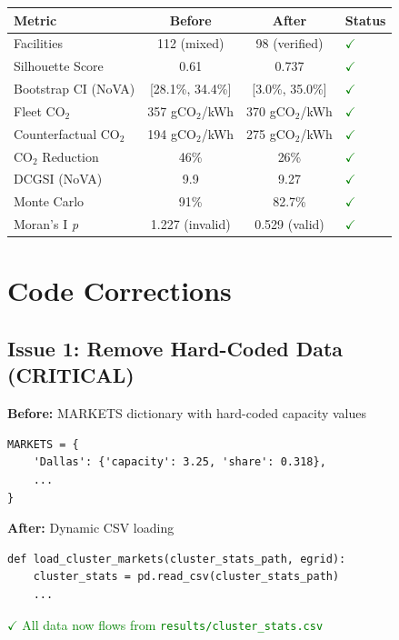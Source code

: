 \documentclass[11pt,a4paper]{article}
\begin{document}
\begin{center}
\begin{tabular}{lccl}
\toprule
\textbf{Metric} & \textbf{Before} & \textbf{After} & \textbf{Status} \\
\midrule
Facilities & 112 (mixed) & 98 (verified) & \textcolor{green}{$\checkmark$} \\
Silhouette Score & 0.61 & 0.737 & \textcolor{green}{$\checkmark$} \\
Bootstrap CI (NoVA) & {[}28.1\%, 34.4\%{]} & {[}3.0\%, 35.0\%{]} & \textcolor{green}{$\checkmark$} \\
Fleet CO$_2$ & 357 gCO$_2$/kWh & 370 gCO$_2$/kWh & \textcolor{green}{$\checkmark$} \\
Counterfactual CO$_2$ & 194 gCO$_2$/kWh & 275 gCO$_2$/kWh & \textcolor{green}{$\checkmark$} \\
CO$_2$ Reduction & 46\% & 26\% & \textcolor{green}{$\checkmark$} \\
DCGSI (NoVA) & 9.9 & 9.27 & \textcolor{green}{$\checkmark$} \\
Monte Carlo & 91\% & 82.7\% & \textcolor{green}{$\checkmark$} \\
Moran's I \textit{p} & 1.227 (invalid) & 0.529 (valid) & \textcolor{green}{$\checkmark$} \\
\bottomrule
\end{tabular}
\end{center}

\section{Code Corrections}

\subsection{Issue 1: Remove Hard-Coded Data (CRITICAL)}

\textbf{Before:} MARKETS dictionary with hard-coded capacity values
\begin{verbatim}
MARKETS = {
    'Dallas': {'capacity': 3.25, 'share': 0.318},
    ...
}
\end{verbatim}

\textbf{After:} Dynamic CSV loading
\begin{verbatim}
def load_cluster_markets(cluster_stats_path, egrid):
    cluster_stats = pd.read_csv(cluster_stats_path)
    ...
\end{verbatim}

\textcolor{green}{$\checkmark$ All data now flows from \texttt{results/cluster\_stats.csv}}
\end{document}

